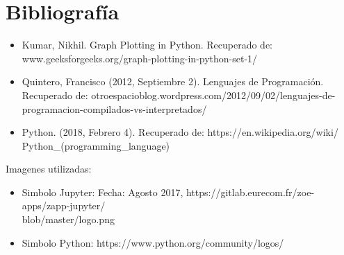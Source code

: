 \documentclass[12pt]{article}
\begin{document}
\section{Bibliografía}
\begin{itemize}
    \item Kumar, Nikhil. Graph Plotting in Python. Recuperado de: www.geeksforgeeks.org/graph-plotting-in-python-set-1/
    \item Quintero, Francisco (2012, Septiembre 2). Lenguajes de Programación. Recuperado de: otroespacioblog.wordpress.com/2012/09/02/lenguajes-de-programacion-compilados-vs-interpretados/
    \item Python. (2018, Febrero 4). Recuperado de: https://en.wikipedia.org/wiki/\\Python\_(programming\_language)
\end{itemize}

Imagenes utilizadas: 
\begin{itemize}
    \item Simbolo Jupyter: Fecha: Agosto 2017, https://gitlab.eurecom.fr/zoe-apps/zapp-jupyter/\\blob/master/logo.png
    \item Simbolo Python: https://www.python.org/community/logos/ 
\end{itemize}
\end{document}
